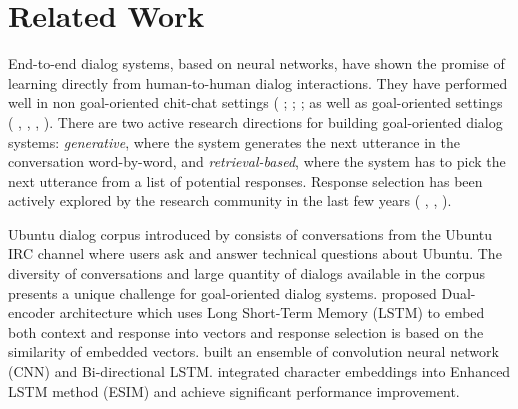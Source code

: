 \documentclass[letterpaper]{article} %
\begin{document}
\section{Related Work}
\label{related-work}
End-to-end dialog systems, based on neural networks, have shown the promise of learning directly from human-to-human dialog interactions. They have performed well in non goal-oriented chit-chat settings (
\citeauthor{vinyals2015neural} ; \citeauthor{sordoni2015neural} ; \citeauthor{serban2016building} ;
as well as goal-oriented settings (\citeauthor{le2016lstm} , \citeauthor{ghazvininejad2017knowledge} ,  \citeauthor{bordes2016learning} , \citeauthor{seo2016query} ). There are two active research directions for building goal-oriented dialog systems: \textit{generative}, where the system generates the next utterance in the conversation word-by-word, and \textit{retrieval-based}, where the system has to pick the next utterance from a list of potential responses. Response selection has been actively explored by the research community in the last few years (\citeauthor{dong2018enhance} , \citeauthor{wu2016sequential} , \citeauthor{bartl2017retrieval} ).

Ubuntu dialog corpus introduced by \citeauthor{lowe2015ubuntu}  consists of conversations from the Ubuntu IRC channel where users ask and answer technical questions about Ubuntu. The diversity of conversations and large quantity of dialogs available in the corpus presents a unique challenge for goal-oriented dialog systems. \citeauthor{lowe2015ubuntu}  proposed Dual-encoder architecture which uses Long Short-Term Memory (LSTM) \cite{hochreiter1997long} to embed both context and response into vectors and response selection is based on the similarity of embedded vectors. \citeauthor{kadlec2015improved}  built an ensemble of convolution neural network (CNN) \citeauthor{krizhevsky2012imagenet}  and Bi-directional LSTM.
\citeauthor{dong2018enhance}  integrated character embeddings \cite{dos2015boosting} into Enhanced LSTM method (ESIM) \cite{chen2017enhanced} and achieve significant performance improvement.
\end{document}
